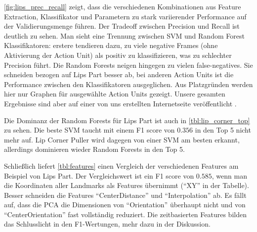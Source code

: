 \cref{fig:lips_prec_recall} zeigt, dass die verschiedenen Kombinationen aus
Feature Extraction, Klassifikator und Parametern zu stark variierender
Performance auf der Validierungsmenge führen. Der Tradeoff zwischen Precision
und Recall ist deutlich zu sehen. Man sieht eine Trennung zwischen SVM und
Random Forest Klassifikatoren: erstere tendieren dazu, zu viele negative Frames
(ohne Aktivierung der Action Unit) als positiv zu klassifizieren, was zu
schlechter Precision führt. Die Random Forests neigen hingegen zu vielen false-negatives. Sie schneiden bezogen auf Lips Part besser ab, bei anderen Action
Units ist die Performance zwischen den Klassifikatoren ausgeglichen.
Aus Platzgründen werden hier nur Graphen für ausgewählte Action Units gezeigt.
Unsere gesamten Ergebnisse sind aber auf einer von uns
erstellten Internetseite veröffentlicht
.




Die Dominanz der Random Forests für Lips Part ist auch in
\cref{tbl:lip_corner_top} zu sehen. Die beste SVM taucht mit einem F1 score von
$0.356$ in den Top 5 nicht mehr auf. Lip Corner Puller wird dagegen von einer
SVM am besten erkannt, allerdings dominieren wieder Random Forests in den Top 5.


Schließlich liefert \cref{tbl:features} einen Vergleich der verschiedenen
Features am Beispiel von Lips Part. Der Vergleichswert ist ein F1 score von
$0.585$, wenn man die Koordinaten aller Landmarks als Features übernimmt ("`XY"'
in der Tabelle). Besser schneiden die Features "`CenterDistance"' und
"`Interpolation"' ab. Es fällt auf, dass die PCA die Dimensionen von
"`Orientation"' überhaupt nicht und von "`CenterOrientation"' fast vollständig reduziert. Die zeitbasierten Features bilden das Schlusslicht in den
F1-Wertungen, mehr dazu in der Diskussion.

